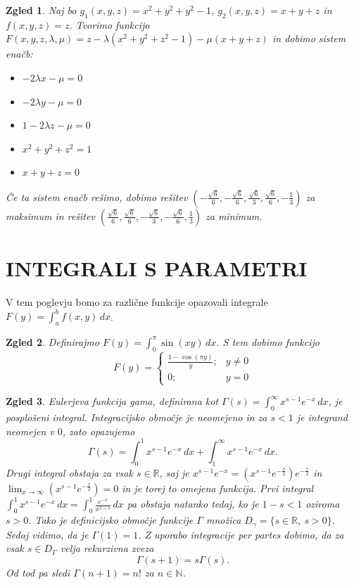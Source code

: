 \documentclass[10pt, a4paper]{article}
\newtheorem{zgled}{Zgled}[section]
\newcommand{\N}{\mathbb {N}}
\newcommand{\R}{\mathbb {R}}
\begin{document}
\begin{zgled}
    Naj bo $g_1 (x, y, z) = x^2 + y^2 + y^2 - 1$, $g_2 (x, y, z) = x + y + z$ in $f(x, y, z) = z$.
    Tvorimo funkcijo $F(x, y, z, \lambda, \mu) = z - \lambda (x^2 + y^2 + z^2 - 1) - \mu (x + y + z)$
    in dobimo sistem enačb:   
    \begin{itemize}
        \item $-2 \lambda x - \mu = 0$
        \item $-2 \lambda y - \mu = 0$
        \item $1 - 2 \lambda z - \mu = 0$
        \item $x^2 + y^2 + z^2 = 1$
        \item $x + y + z = 0$
    \end{itemize}
    Če ta sistem enačb rešimo, dobimo rešitev $\left(-\frac{\sqrt{6}}{6}, -\frac{\sqrt{6}}{6}, \frac{\sqrt{6}}{3}, \frac{\sqrt{6}}{6}, -\frac{1}{3}\right)$
    za maksimum in rešitev $\left(\frac{\sqrt{6}}{6}, \frac{\sqrt{6}}{6}, -\frac{\sqrt{6}}{3}, -\frac{\sqrt{6}}{6}, \frac{1}{3}\right)$
    za minimum.
\end{zgled}

\clearpage 
\section{INTEGRALI S PARAMETRI}

V tem poglevju bomo za različne funkcije opazovali integrale $F(y) = \int_a ^b f(x, y)\,dx$.

\begin{zgled}
    Definirajmo $F(y) = \int_0 ^\pi \sin (xy)\, dx$. S tem dobimo funkcijo 
    $$F(y) = \begin{cases}
        \frac{1 - \cos(\pi y)}{y} ;& y \neq 0\\
        0 ;& y = 0
    \end{cases}$$
\end{zgled}

\begin{zgled}\label{zgl:2}
    Eulerjeva funkcija gama, definirana kot $\Gamma (s) = \int_0 ^\infty x^{s - 1} e^{-x}\, dx$, je posplošeni integral.
    Integracijsko območje je neomejeno in za $s < 1$ je integrand neomejen v $0$, zato opazujemo 
    $$\Gamma (s) = \int_0 ^1 x^{s - 1} e^{-x}\, dx + \int_1 ^\infty x^{s - 1} e^{-x}\, dx.$$
    Drugi integral obstaja za vsak $s \in \R$, saj je $x^{s - 1} e^{-x} = \left(x^{s - 1} e^{-\frac{x}{2}}\right) e^{-\frac{x}{2}}$
    in $\lim_{x \to \infty} \left(x^{s - 1} e^{-\frac{x}{2}}\right) = 0$ in je torej to omejena funkcija.
    Prvi integral $\int_0 ^1 x^{s - 1} e^{-x}\, dx = \int_0 ^1 \frac{e^{-x}}{x^{1 - s}}\, dx$ pa obstaja natanko tedaj,
    ko je $1 - s < 1$ oziroma $s > 0$. Tako je definicijsko območje funkcije $\Gamma$ množica $D_\gamma = \{s \in \R,\ s > 0\}$.
    Sedaj vidimo, da je $\Gamma (1) = 1$. Z uporabo integracije per partes dobimo, da za vsak $s \in D_\Gamma$ velja 
    rekurzivna zveza $$\Gamma (s + 1) = s \Gamma (s).$$ Od tod pa sledi $\Gamma (n + 1) = n!$ za $n \in \N$. 
\end{zgled}
\end{document}
